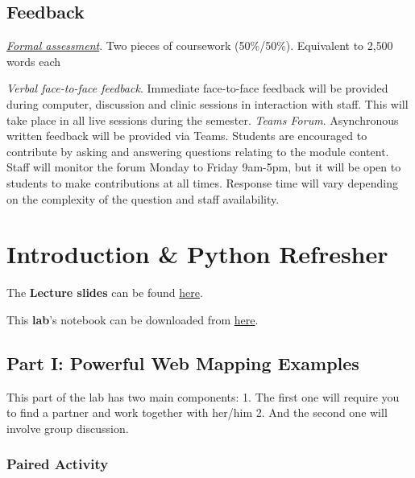 \documentclass[
  letterpaper,
  DIV=11,
  numbers=noendperiod]{scrreprt}
\begin{document}
\section*{Feedback}\label{feedback}


\href{https://gdsl-ul.github.io/wma/assess.html}{\emph{Formal
assessment}}. Two pieces of coursework (50\%/50\%). Equivalent to 2,500
words each

\emph{Verbal face-to-face feedback}. Immediate face-to-face feedback
will be provided during computer, discussion and clinic sessions in
interaction with staff. This will take place in all live sessions during
the semester. \emph{Teams Forum}. Asynchronous written feedback will be
provided via Teams. Students are encouraged to contribute by asking and
answering questions relating to the module content. Staff will monitor
the forum Monday to Friday 9am-5pm, but it will be open to students to
make contributions at all times. Response time will vary depending on
the complexity of the question and staff availability.


\chapter{Introduction \& Python
Refresher}\label{introduction-python-refresher}

The \textbf{Lecture slides} can be found
\href{https://slides.com/gfilo/web-mapping-and-geovisualisation-envs456/fullscreen}{here}.

This \textbf{lab}'s notebook can be downloaded from
\href{https://github.com/GDSL-UL/wma/blob/main/labs/w01_intro.ipynb}{here}.

\section{Part I: Powerful Web Mapping
Examples}\label{part-i-powerful-web-mapping-examples}

This part of the lab has two main components: 1. The first one will
require you to find a partner and work together with her/him 2. And the
second one will involve group discussion.

\subsection{Paired Activity}\label{paired-activity}
\end{document}
